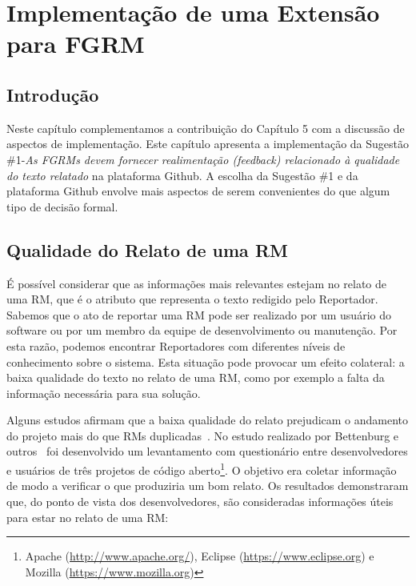 \chapter{Implementação de uma Extensão para FGRM}
\label{ch:implemtacao_extensao}

\section{Introdução}
\label{sec:implemtacao_extensao_intro}

Neste capítulo complementamos a contribuição do Capítulo 5 com a discussão de
aspectos de implementação. Este capítulo apresenta a implementação da Sugestão
\#1\@-\@\textit{As FGRMs devem fornecer realimentação (feedback) relacionado à
    qualidade do texto relatado} na plataforma Github. A escolha da Sugestão
\#1 e da plataforma Github envolve mais aspectos de serem convenientes do que
algum tipo de decisão formal.

\section{Qualidade do Relato de uma RM}
\label{sec:avaliando_a_qualidade_do_relato_de_uma_rm}

É possível considerar que as informações mais relevantes estejam no relato de
uma RM, que é o atributo que representa o texto redigido pelo Reportador.
Sabemos que o ato de reportar uma RM pode ser realizado por um usuário do
software ou por um membro da equipe de desenvolvimento ou manutenção. Por esta
razão, podemos encontrar Reportadores com diferentes níveis de conhecimento
sobre o sistema. Esta situação pode provocar um efeito colateral: a baixa
qualidade do texto no relato de uma RM, como por exemplo a falta da informação
necessária para sua solução.

Alguns estudos afirmam que a baixa qualidade do relato prejudicam o andamento do
projeto mais do que RMs duplicadas~\cite{bettenburg2007quality}. No estudo
realizado por Bettenburg e outros~\cite{bettenburg2008makes} foi desenvolvido um
levantamento com questionário entre desenvolvedores e usuários de três projetos
de código aberto\footnote{Apache (\url{http://www.apache.org/}), Eclipse
    (\url{https://www.eclipse.org}) e Mozilla (\url{https://www.mozilla.org})}.
O objetivo era coletar informação de modo a verificar o que produziria um bom
relato. Os resultados demonstraram que, do ponto de vista dos desenvolvedores,
são consideradas informações úteis para estar no relato de uma RM\@:

